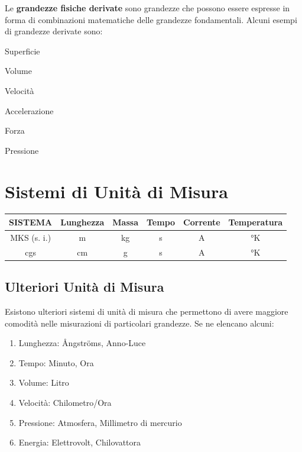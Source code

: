 \documentclass[a4paper,11pt,oneside]{book}
\begin{document}
\noindent Le \textbf{grandezze fisiche derivate} sono grandezze che possono essere
espresse in forma di combinazioni matematiche delle grandezze fondamentali.
Alcuni esempi di grandezze derivate sono:
\begin{itemize}
    \begin{multicols}{2}
        \item Superficie
        \item Volume
        \item Velocità
        \item Accelerazione
        \item Forza
        \item Pressione
    \end{multicols}
\end{itemize}

\section{Sistemi di Unità di Misura}
\begin{center}
    \bgroup
    \def\arraystretch{1.5}
    \begin{tabular}{ |c| c c c c c|}
        \hline
        SISTEMA     & Lunghezza & Massa & Tempo & Corrente & Temperatura \\
        \hline
        MKS (s. i.) & m         & kg    & s     & A        & °K          \\
        \hline
        cgs         & cm        & g     & s     & A        & °K          \\
        \hline
    \end{tabular}
    \egroup
\end{center}

\subsection{Ulteriori Unità di Misura}
Esistono ulteriori sistemi di unità di misura che permettono di avere maggiore comodità
nelle misurazioni di particolari grandezze.
Se ne elencano alcuni:

\begin{enumerate}
    \item Lunghezza:    \tabto{3cm} Ångströms, Anno-Luce
    \item Tempo:        \tabto{3cm} Minuto, Ora
    \item Volume:       \tabto{3cm} Litro
    \item Velocità:     \tabto{3cm} Chilometro/Ora
    \item Pressione:    \tabto{3cm} Atmosfera, Millimetro di mercurio
    \item Energia:      \tabto{3cm} Elettrovolt, Chilovattora
\end{enumerate}
\end{document}
